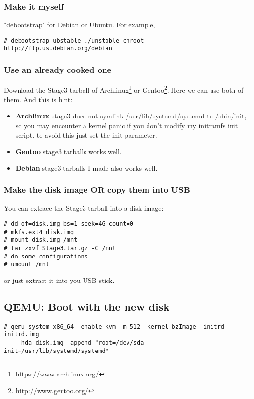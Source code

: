 \documentclass[10pt,a4paper]{article}
\begin{document}
\subsubsection{Make it myself}
"debootstrap" for Debian or Ubuntu. For example,
\begin{verbatim}
# debootstrap ubstable ./unstable-chroot http://ftp.us.debian.org/debian
\end{verbatim}

\subsubsection{Use an already cooked one}
Download the Stage3 tarball of Archlinux\footnote{https://www.archlinux.org/} 
or Gentoo\footnote{http://www.gentoo.org/}.\newline
Here we can use both of them. And this is hint:
\begin{itemize}
\item \textbf{Archlinux} stage3 does not symlink /usr/lib/systemd/systemd to /sbin/init,
	so you may encounter a kernel panic if you don't modify my initramfs init script.
	to avoid this just set the init parameter.
\item \textbf{Gentoo} stage3 tarballs works well.
\item \textbf{Debian} stage3 tarballs I made also works well.
\end{itemize}
\subsubsection{Make the disk image OR copy them into USB}
You can extrace the Stage3 tarball into a disk image:
\begin{framed}\begin{verbatim}
# dd of=disk.img bs=1 seek=4G count=0
# mkfs.ext4 disk.img
# mount disk.img /mnt
# tar zxvf Stage3.tar.gz -C /mnt
# do some configurations
# umount /mnt
\end{verbatim}\end{framed}
or just extract it into you USB stick.

\subsection{QEMU: Boot with the new disk}
\begin{verbatim}
# qemu-system-x86_64 -enable-kvm -m 512 -kernel bzImage -initrd initrd.img
    -hda disk.img -append "root=/dev/sda init=/usr/lib/systemd/systemd"
\end{verbatim}
\end{document}

